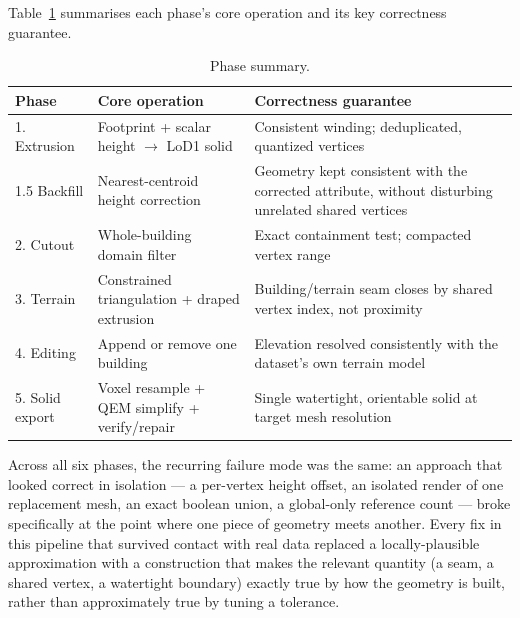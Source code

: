 \documentclass[11pt]{article}
\begin{document}
Table~\ref{tab:phases} summarises each phase's core operation and its key correctness
guarantee.

\begin{table}[h]
\centering
\begin{tabular}{@{}p{2.6cm}p{5.6cm}p{6cm}@{}}
\toprule
\textbf{Phase} & \textbf{Core operation} & \textbf{Correctness guarantee} \\
\midrule
1. Extrusion & Footprint + scalar height $\to$ LoD1 solid & Consistent winding; deduplicated, quantized vertices \\
1.5 Backfill & Nearest-centroid height correction & Geometry kept consistent with the corrected attribute, without disturbing unrelated shared vertices \\
2. Cutout & Whole-building domain filter & Exact containment test; compacted vertex range \\
3. Terrain & Constrained triangulation + draped extrusion & Building/terrain seam closes by shared vertex index, not proximity \\
4. Editing & Append or remove one building & Elevation resolved consistently with the dataset's own terrain model \\
5. Solid export & Voxel resample + QEM simplify + verify/repair & Single watertight, orientable solid at target mesh resolution \\
\bottomrule
\end{tabular}
\caption{Phase summary.}
\label{tab:phases}
\end{table}

Across all six phases, the recurring failure mode was the same: an approach that looked correct
in isolation --- a per-vertex height offset, an isolated render of one replacement mesh, an
exact boolean union, a global-only reference count --- broke specifically at the point where
one piece of geometry meets another. Every fix in this pipeline that survived contact with real
data replaced a locally-plausible approximation with a construction that makes the relevant
quantity (a seam, a shared vertex, a watertight boundary) exactly true by how the geometry is
built, rather than approximately true by tuning a tolerance.
\end{document}
